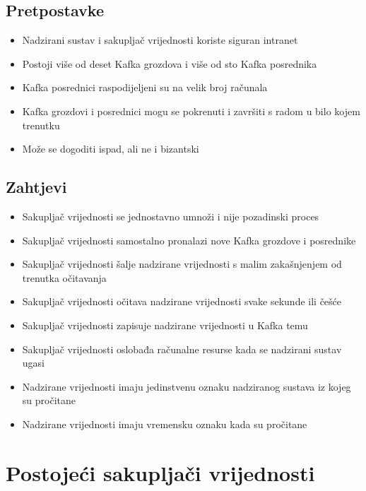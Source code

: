 \documentclass[utf8, diplomski, lmodern, numeric]{fer}
\begin{document}
\section{Pretpostavke}

\begin{itemize}
    \item Nadzirani sustav i sakupljač vrijednosti koriste siguran intranet
    \item Postoji više od deset Kafka grozdova i više od sto Kafka posrednika
    \item Kafka posrednici raspodijeljeni su na velik broj računala
    \item Kafka grozdovi i posrednici mogu se pokrenuti i završiti s radom u bilo kojem trenutku
    \item Može se dogoditi ispad, ali ne i bizantski \citep{kafka-docs}
\end{itemize}


\section{Zahtjevi}

\begin{itemize}
    \item Sakupljač vrijednosti se jednostavno umnoži i nije pozadinski proces
    \item Sakupljač vrijednosti samostalno pronalazi nove Kafka grozdove i posrednike
    \item Sakupljač vrijednosti šalje nadzirane vrijednosti s malim zakašnjenjem od trenutka očitavanja
    \item Sakupljač vrijednosti očitava nadzirane vrijednosti svake sekunde ili češće
    \item Sakupljač vrijednosti zapisuje nadzirane vrijednosti u Kafka temu
    \item Sakupljač vrijednosti oslobađa računalne resurse kada se nadzirani sustav ugasi
    \item Nadzirane vrijednosti imaju jedinstvenu oznaku nadziranog sustava iz kojeg su pročitane
    \item Nadzirane vrijednosti imaju vremensku oznaku kada su pročitane
\end{itemize}



\chapter{Postojeći sakupljači vrijednosti}
\end{document}
